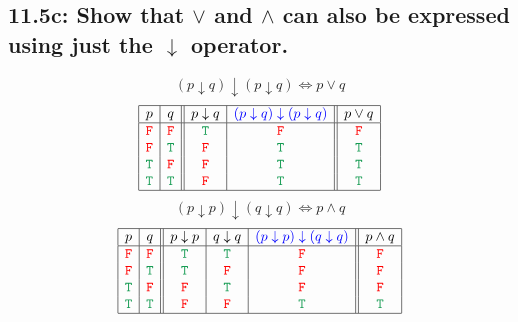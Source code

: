 \documentclass{article}
\newcommand\true{\textcolor{ForestGreen}{\texttt{T}}}
\newcommand\false{\textcolor{red}{\texttt{F}}}
\begin{document}
\subsection*{11.5c: Show that $\lor$ and $\land$ can also be expressed using just the $\downarrow$ operator.}
\[(p\downarrow q)\downarrow(p\downarrow q)\Leftrightarrow p\lor q\]
\[\begin{array}{|c|c||c|c||c|}
\hline
p&q&p\downarrow q&\textcolor{blue}{(p\downarrow q)\downarrow(p\downarrow q)}&p\lor q\\
\hline
\false&\false&\true&\false&\false\\
\false&\true&\false&\true&\true\\
\true&\false&\false&\true&\true\\
\true&\true&\false&\true&\true\\
\hline
\end{array}\]
\[(p\downarrow p)\downarrow(q\downarrow q)\Leftrightarrow p\land q\]
\[\begin{array}{|c|c||c|c|c||c|}
\hline
p&q&p\downarrow p&q\downarrow q&\textcolor{blue}{(p\downarrow p)\downarrow(q\downarrow q)}&p\land q\\
\hline
\false&\false&\true&\true&\false&\false\\
\false&\true&\true&\false&\false&\false\\
\true&\false&\false&\true&\false&\false\\
\true&\true&\false&\false&\true&\true\\
\hline
\end{array}\]
\end{document}

